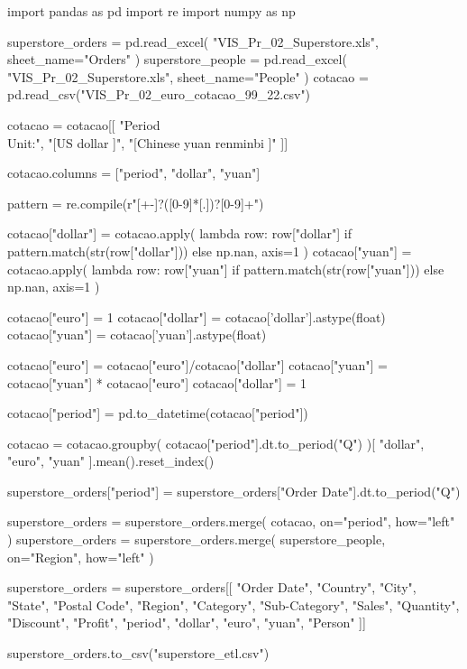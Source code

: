 \begin{python}

import pandas as pd
import re
import numpy as np

superstore_orders = pd.read_excel(
    "VIS_Pr_02_Superstore.xls",
    sheet_name="Orders"
)
superstore_people = pd.read_excel(
    "VIS_Pr_02_Superstore.xls",
    sheet_name="People"
)
cotacao = pd.read_csv("VIS_Pr_02_euro_cotacao_99_22.csv")

cotacao = cotacao[[
    "Period\\Unit:",
    "[US dollar ]",
    "[Chinese yuan renminbi ]"
]]

cotacao.columns = ["period", "dollar", "yuan"]

pattern = re.compile(r"[+-]?([0-9]*[.])?[0-9]+")

cotacao["dollar"] = cotacao.apply(
    lambda row: 
        row["dollar"] 
        if pattern.match(str(row["dollar"]))
        else np.nan,
    axis=1
)
cotacao["yuan"] = cotacao.apply(
    lambda row: 
        row["yuan"]
        if pattern.match(str(row["yuan"]))
        else np.nan,
    axis=1
)

cotacao["euro"] = 1
cotacao["dollar"] = cotacao['dollar'].astype(float)
cotacao["yuan"] = cotacao['yuan'].astype(float)

cotacao["euro"] = cotacao["euro"]/cotacao["dollar"]
cotacao["yuan"] = cotacao["yuan"] * cotacao["euro"]
cotacao["dollar"] = 1

cotacao["period"] = pd.to_datetime(cotacao["period"])

cotacao = cotacao.groupby(
    cotacao["period"].dt.to_period("Q")
)[
    "dollar",
    "euro",
    "yuan"
].mean().reset_index()

superstore_orders["period"] = superstore_orders["Order Date"].dt.to_period("Q")

superstore_orders = superstore_orders.merge(
    cotacao,
    on="period",
    how="left"
)
superstore_orders = superstore_orders.merge(
    superstore_people,
    on="Region",
    how="left"
)

superstore_orders = superstore_orders[[
    "Order Date",
    "Country",
    "City",
    "State",
    "Postal Code",
    "Region",
    "Category",
    "Sub-Category",
    "Sales",
    "Quantity",
    "Discount",
    "Profit",
    "period",
    "dollar",
    "euro",
    "yuan",
    "Person"
]]

superstore_orders.to_csv("superstore_etl.csv")
\end{python}


